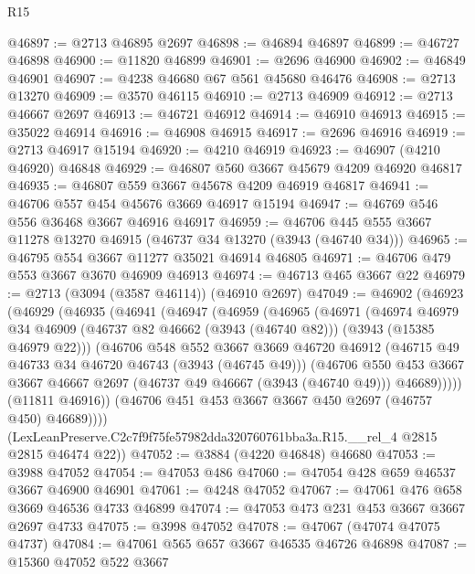 \begin{lexlean}{R15}
\begin{coremodule}
@46897 := @2713 @46895 @2697
@46898 := @46894 @46897
@46899 := @46727 @46898
@46900 := @11820 @46899
@46901 := @2696 @46900
@46902 := @46849 @46901
@46907 := @4238 @46680 @67 @561 @45680 @46476
@46908 := @2713 @13270
@46909 := @3570 @46115
@46910 := @2713 @46909
@46912 := @2713 @46667 @2697
@46913 := @46721 @46912
@46914 := @46910 @46913
@46915 := @35022 @46914
@46916 := @46908 @46915
@46917 := @2696 @46916
@46919 := @2713 @46917 @15194
@46920 := @4210 @46919
@46923 := @46907 (@4210 @46920) @46848
@46929 := @46807 @560 @3667 @45679 @4209 @46920 @46817
@46935 := @46807 @559 @3667 @45678 @4209 @46919 @46817
@46941 := @46706 @557 @454 @45676 @3669 @46917 @15194
@46947 := @46769 @546 @556 @36468 @3667 @46916 @46917
@46959 := @46706 @445 @555 @3667 @11278 @13270 @46915 (@46737 @34 @13270 (@3943 (@46740 @34)))
@46965 := @46795 @554 @3667 @11277 @35021 @46914 @46805
@46971 := @46706 @479 @553 @3667 @3670 @46909 @46913
@46974 := @46713 @465 @3667 @22
@46979 := @2713 (@3094 (@3587 @46114)) (@46910 @2697)
@47049 := @46902
    (@46923
      (@46929
        (@46935
          (@46941
            (@46947
              (@46959
                (@46965
                  (@46971
                    (@46974
                      @46979
                      @34
                      @46909
                      (@46737 @82 @46662 (@3943 (@46740 @82)))
                      (@3943 (@15385 @46979 @22)))
                    (@46706
                      @548
                      @552
                      @3667
                      @3669
                      @46720
                      @46912
                      (@46715 @49 @46733 @34 @46720 @46743 (@3943 (@46745 @49)))
                      (@46706
                        @550
                        @453
                        @3667
                        @3667
                        @46667
                        @2697
                        (@46737 @49 @46667 (@3943 (@46740 @49)))
                        @46689)))))
              (@11811 @46916))
            (@46706 @451 @453 @3667 @3667 @450 @2697 (@46757 @450) @46689))))
      (LexLeanPreserve.C2c7f9f75fe57982dda320760761bba3a.R15.__rel_4 @2815 @2815 @46474 @22))
@47052 := @3884 (@4220 @46848) @46680
@47053 := @3988 @47052
@47054 := @47053 @486
@47060 := @47054 @428 @659 @46537 @3667 @46900 @46901
@47061 := @4248 @47052
@47067 := @47061 @476 @658 @3669 @46536 @4733 @46899
@47074 := @47053 @473 @231 @453 @3667 @3667 @2697 @4733
@47075 := @3998 @47052
@47078 := @47067 (@47074 @47075 @4737)
@47084 := @47061 @565 @657 @3667 @46535 @46726 @46898
@47087 := @15360 @47052 @522 @3667

\end{coremodule}
\end{lexlean}
